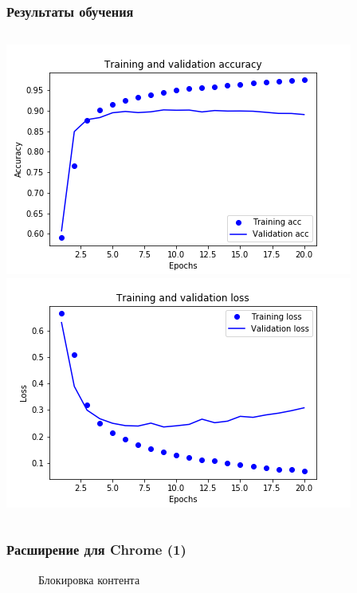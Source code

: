 \documentclass[xetex,mathserif,serif]{beamer}
\begin{document}
	\begin{frame}
		\frametitle{Результаты обучения}
	    	\begin{columns}[t]
                    \includegraphics[scale=0.37]{images/acc.png}
                    \includegraphics[scale=0.37]{images/loss.png}
            \end{columns}
	\end{frame}		
	
	\begin{frame}
		\frametitle{Расширение для Chrome (1)}
		\begin{figure}[h]
            \caption{Блокировка контента}
            \label{fig:image}
        \end{figure}
	\end{frame}	
	
\end{document}
